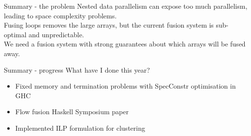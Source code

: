 \documentclass{beamer}
\newcommand{\fr}[1]{\begin{frame}[fragile]{#1}}
\begin{document}
\fr{Summary - the problem}
Nested data parallelism can expose too much parallelism, leading to space complexity problems.
\\
Fusing loops removes the large arrays, but the current fusion system is sub-optimal and unpredictable.
\\
We need a fusion system with strong guarantees about which arrays will be fused away.
\end{frame}

\fr{Summary - progress}
What have I done this year?
\begin{itemize}
\item
Fixed memory and termination problems with SpecConstr optimisation in GHC
\item
Flow fusion Haskell Symposium paper
\item
Implemented ILP formulation for clustering
\end{itemize}


\end{frame}
\end{document}
